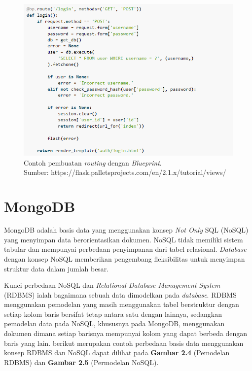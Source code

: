 \begin{figure}[H]
	\centering
	\includegraphics[width=12cm]{gambar/flask3.png}
	\caption{Contoh pembuatan \emph{routing} dengan \emph{Blueprint}. \\ Sumber: https://flask.palletsprojects.com/en/2.1.x/tutorial/views/}
	\label{Gambar:registrasi blueprint}
\end{figure}

\section{MongoDB}

MongoDB adalah basis data yang menggunakan konsep \emph{Not Only} SQL (NoSQL) yang menyimpan data berorientasikan dokumen. NoSQL tidak memiliki sistem tabular dan mempunyai perbedaan penyimpanan dari tabel relasional. \emph{Database} dengan konsep NoSQL memberikan pengembang fleksibilitas untuk menyimpan struktur data dalam jumlah besar.

Kunci perbedaan NoSQL dan \emph{Relational Database Management System} (RDBMS) ialah bagaimana sebuah data dimodelkan pada \emph{database}. RDBMS menggunakan pemodelan yang masih menggunakan tabel berstruktur dengan setiap kolom baris bersifat tetap antara satu dengan lainnya, sedangkan pemodelan data pada NoSQL, khususnya pada MongoDB, menggunakan dokumen dimana setiap barisnya mempunyai kolom yang dapat berbeda dengan baris yang lain. berikut merupakan contoh perbedaan basis data menggunakan konsep RDBMS dan NoSQL dapat dilihat pada \textbf{Gambar 2.4} (Pemodelan RDBMS) dan \textbf{Gambar 2.5} (Permodelan NoSQL).

